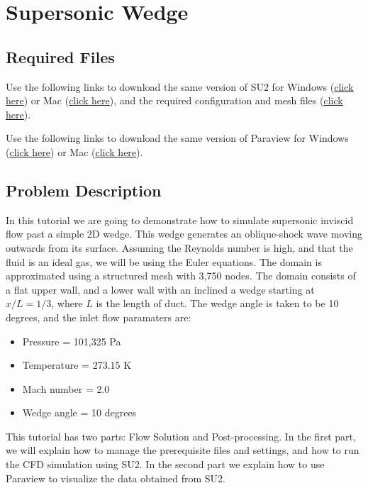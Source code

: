 \chapter{Supersonic Wedge}
\label{ch:Supersonic Wedge}
\section{Required Files}
\begin{su2note}
	Use the following links to download the same version of SU2 for Windows (\href{https://users.encs.concordia.ca/~bvermeir/book/executables/windows/SU2_Windows.zip}{\underline{click here}}) or Mac (\href{https://users.encs.concordia.ca/~bvermeir/book/executables/osx/SU2_Mac.zip}{\underline{click here}}), and the required configuration and mesh files (\href{https://gitlab.com/bvermeir/book-cfd/blob/master/tutorial/tut2_supersonic_wedge/wedge.zip}{\underline{click here}}).
\end{su2note}
\begin{paraviewnote}
	Use the following links to download the same version of Paraview for Windows (\href{https://users.encs.concordia.ca/~bvermeir/book/executables/windows/ParaView-5.4.0-Qt5-OpenGL2-Windows-64bit.exe}{\underline{click here}}) or Mac (\href{https://users.encs.concordia.ca/~bvermeir/book/executables/osx/ParaView-5.4.0-Qt5-OpenGL2-MPI-OSX10.8-64bit.dmg}{\underline{click here}}).
\end{paraviewnote}

\section{Problem Description}
In this tutorial we are going to demonstrate how to simulate supersonic inviscid flow past a simple 2D wedge. This wedge generates an oblique-shock wave moving outwards from its surface. Assuming the Reynolds number is high, and that the fluid is an ideal gas, we will be using the Euler equations. The domain is approximated using a structured mesh with 3,750 nodes. The domain consists of a flat upper wall, and a lower wall with an inclined a wedge starting at $x/L=1/3$, where $L$ is the length of duct. The wedge angle is taken to be 10 degrees, and the inlet flow paramaters are:
\begin{itemize}
    \item Pressure = 101,325 Pa
    \item Temperature = 273.15 K
    \item Mach number = 2.0
    \item Wedge angle = 10 degrees
\end{itemize}
This tutorial has two parts: Flow Solution and Post-processing. In the first part, we will explain how to manage the prerequisite files and settings, and how to run the CFD simulation using SU2. In the second part we explain how to use Paraview to visualize the data obtained from SU2.
